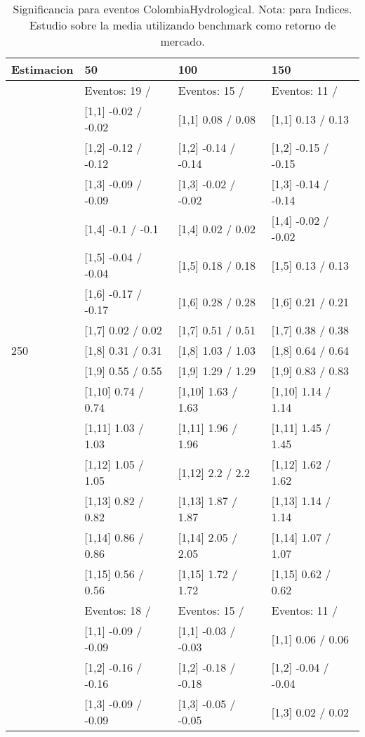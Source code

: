 \begin{table}

\caption{Significancia para eventos ColombiaHydrological. Nota: para Indices. Estudio sobre la media utilizando benchmark como retorno de mercado.}
\centering
\begin{tabular}[t]{llll}
\toprule
Estimacion & 50 & 100 & 150\\
\midrule
 & Eventos:  19 / & Eventos:  15 / & Eventos:  11 /\\
 & {}[1,1] -0.02  / -0.02 & {}[1,1] 0.08  / 0.08 & {}[1,1] 0.13  / 0.13\\
 & {}[1,2] -0.12  / -0.12 & {}[1,2] -0.14  / -0.14 & {}[1,2] -0.15  / -0.15\\
 & {}[1,3] -0.09  / -0.09 & {}[1,3] -0.02  / -0.02 & {}[1,3] -0.14  / -0.14\\
 & {}[1,4] -0.1  / -0.1 & {}[1,4] 0.02  / 0.02 & {}[1,4] -0.02  / -0.02\\
\addlinespace
 & {}[1,5] -0.04  / -0.04 & {}[1,5] 0.18  / 0.18 & {}[1,5] 0.13  / 0.13\\
 & {}[1,6] -0.17  / -0.17 & {}[1,6] 0.28  / 0.28 & {}[1,6] 0.21  / 0.21\\
 & {}[1,7] 0.02  / 0.02 & {}[1,7] 0.51  / 0.51 & {}[1,7] 0.38  / 0.38\\
250 & {}[1,8] 0.31  / 0.31 & {}[1,8] 1.03  / 1.03 & {}[1,8] 0.64  / 0.64\\
 & {}[1,9] 0.55  / 0.55 & {}[1,9] 1.29  / 1.29 & {}[1,9] 0.83  / 0.83\\
\addlinespace
 & {}[1,10] 0.74  / 0.74 & {}[1,10] 1.63  / 1.63 & {}[1,10] 1.14  / 1.14\\
 & {}[1,11] 1.03  / 1.03 & {}[1,11] 1.96  / 1.96 & {}[1,11] 1.45  / 1.45\\
 & {}[1,12] 1.05  / 1.05 & {}[1,12] 2.2  / 2.2 & {}[1,12] 1.62  / 1.62\\
 & {}[1,13] 0.82  / 0.82 & {}[1,13] 1.87  / 1.87 & {}[1,13] 1.14  / 1.14\\
 & {}[1,14] 0.86  / 0.86 & {}[1,14] 2.05  / 2.05 & {}[1,14] 1.07  / 1.07\\
\addlinespace
 & {}[1,15] 0.56  / 0.56 & {}[1,15] 1.72  / 1.72 & {}[1,15] 0.62  / 0.62\\
 & Eventos:  18 / & Eventos:  15 / & Eventos:  11 /\\
 & {}[1,1] -0.09  / -0.09 & {}[1,1] -0.03  / -0.03 & {}[1,1] 0.06  / 0.06\\
 & {}[1,2] -0.16  / -0.16 & {}[1,2] -0.18  / -0.18 & {}[1,2] -0.04  / -0.04\\
 & {}[1,3] -0.09  / -0.09 & {}[1,3] -0.05  / -0.05 & {}[1,3] 0.02  / 0.02\\

\end{tabular}
\end{table}
